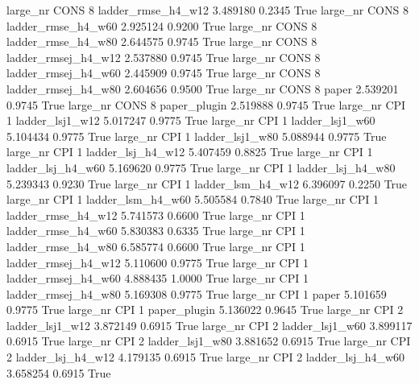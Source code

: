   large_nr     CONS                 8  ladder_rmse_h4_w12    3.489180      0.2345    True
  large_nr     CONS                 8  ladder_rmse_h4_w60    2.925124      0.9200    True
  large_nr     CONS                 8  ladder_rmse_h4_w80    2.644575      0.9745    True
  large_nr     CONS                 8 ladder_rmsej_h4_w12    2.537880      0.9745    True
  large_nr     CONS                 8 ladder_rmsej_h4_w60    2.445909      0.9745    True
  large_nr     CONS                 8 ladder_rmsej_h4_w80    2.604656      0.9500    True
  large_nr     CONS                 8               paper    2.539201      0.9745    True
  large_nr     CONS                 8        paper_plugin    2.519888      0.9745    True
  large_nr      CPI                 1     ladder_lsj1_w12    5.017247      0.9775    True
  large_nr      CPI                 1     ladder_lsj1_w60    5.104434      0.9775    True
  large_nr      CPI                 1     ladder_lsj1_w80    5.088944      0.9775    True
  large_nr      CPI                 1   ladder_lsj_h4_w12    5.407459      0.8825    True
  large_nr      CPI                 1   ladder_lsj_h4_w60    5.169620      0.9775    True
  large_nr      CPI                 1   ladder_lsj_h4_w80    5.239343      0.9230    True
  large_nr      CPI                 1   ladder_lsm_h4_w12    6.396097      0.2250    True
  large_nr      CPI                 1   ladder_lsm_h4_w60    5.505584      0.7840    True
  large_nr      CPI                 1  ladder_rmse_h4_w12    5.741573      0.6600    True
  large_nr      CPI                 1  ladder_rmse_h4_w60    5.830383      0.6335    True
  large_nr      CPI                 1  ladder_rmse_h4_w80    6.585774      0.6600    True
  large_nr      CPI                 1 ladder_rmsej_h4_w12    5.110600      0.9775    True
  large_nr      CPI                 1 ladder_rmsej_h4_w60    4.888435      1.0000    True
  large_nr      CPI                 1 ladder_rmsej_h4_w80    5.169308      0.9775    True
  large_nr      CPI                 1               paper    5.101659      0.9775    True
  large_nr      CPI                 1        paper_plugin    5.136022      0.9645    True
  large_nr      CPI                 2     ladder_lsj1_w12    3.872149      0.6915    True
  large_nr      CPI                 2     ladder_lsj1_w60    3.899117      0.6915    True
  large_nr      CPI                 2     ladder_lsj1_w80    3.881652      0.6915    True
  large_nr      CPI                 2   ladder_lsj_h4_w12    4.179135      0.6915    True
  large_nr      CPI                 2   ladder_lsj_h4_w60    3.658254      0.6915    True
